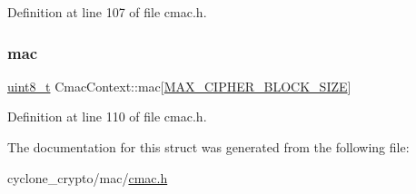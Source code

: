 Definition at line 107 of file cmac.\+h.

\mbox{\label{structCmacContext_a333c4734c4c2f959167d24c5d7f17f73}} 
\subsubsection{\texorpdfstring{mac}{mac}}
{\footnotesize\ttfamily \hyperlink{stdint_8h_aba7bc1797add20fe3efdf37ced1182c5}{uint8\+\_\+t} Cmac\+Context\+::mac\mbox{[}\hyperlink{cyclone__crypto_2core_2crypto_8h_ad7d23a73335aef1d701df177a8f92b80}{M\+A\+X\+\_\+\+C\+I\+P\+H\+E\+R\+\_\+\+B\+L\+O\+C\+K\+\_\+\+S\+I\+ZE}\mbox{]}}



Definition at line 110 of file cmac.\+h.



The documentation for this struct was generated from the following file\+:\begin{DoxyCompactItemize}
\item 
cyclone\+\_\+crypto/mac/\hyperlink{cmac_8h}{cmac.\+h}\end{DoxyCompactItemize}

